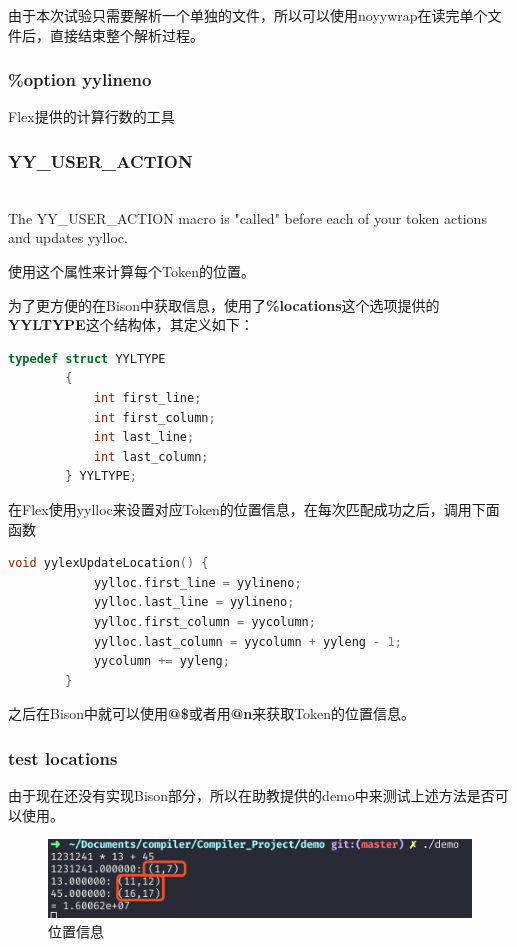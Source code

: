 \documentclass{article}
\begin{document}
	由于本次试验只需要解析一个单独的文件，所以可以使用noyywrap在读完单个文件后，直接结束整个解析过程。
	\subsubsection{\%option yylineno}
	Flex提供的计算行数的工具
	\subsubsection{YY\_USER\_ACTION}
	\begin{info} \\
		The YY\_USER\_ACTION macro is "called" before each of your token actions and updates yylloc.
	\end{info}

	使用这个属性来计算每个Token的位置。
	
	为了更方便的在Bison中获取信息，使用了\textbf{\%locations}这个选项提供的\textbf{YYLTYPE}这个结构体，其定义如下：
	\begin{small}
		\begin{lstlisting}[language=C]
		typedef struct YYLTYPE
		{
			int first_line;
			int first_column;
			int last_line;
			int last_column;
		} YYLTYPE;
		\end{lstlisting}
	\end{small}
	
	在Flex使用yylloc来设置对应Token的位置信息，在每次匹配成功之后，调用下面函数
	\begin{small}
		\begin{lstlisting}[language=C]
		void yylexUpdateLocation() {
			yylloc.first_line = yylineno;
			yylloc.last_line = yylineno;
			yylloc.first_column = yycolumn;
			yylloc.last_column = yycolumn + yyleng - 1;
			yycolumn += yyleng;
		}
		\end{lstlisting}
	\end{small}
	
	之后在Bison中就可以使用\textbf{@\$}或者用\textbf{@n}来获取Token的位置信息。

	\subsubsection{test locations}
	由于现在还没有实现Bison部分，所以在助教提供的demo中来测试上述方法是否可以使用。
	
	\begin{figure}[H]
		\centering
		\includegraphics[width=0.7\linewidth]{locationtest}
		\caption{位置信息}
		\label{fig:locationtest}
	\end{figure}
\end{document}
